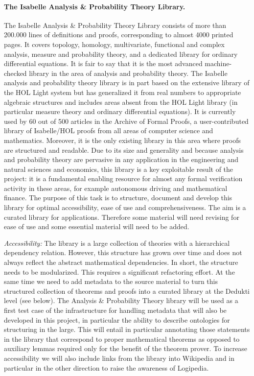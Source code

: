 \paragraph*{The Isabelle Analysis \& Probability Theory Library.}
The Isabelle Analysis \& Probability Theory Library consists of more
than 200.000 lines of definitions and proofs, corresponding to almost
4000 printed pages. It covers topology, homology, multivariate,
functional and complex analysis, measure and probability theory, and a
dedicated library for ordinary differential equations. It is fair to
say that it is the most advanced machine-checked library in the area
of analysis and probability theory. The Isabelle analysis and
probability theory library is in part based on the extensive library
of the HOL Light system but has generalized it from real numbers to
appropriate algebraic structures and includes areas absent from the
HOL Light library (in particular measure theory and ordinary
differential equations). It is currently used by 60 out of 500
articles in the Archive of Formal Proofs, a user-contributed library
of Isabelle/HOL proofs from all areas of computer science and
mathematics. Moreover, it is the only existing library in this area
where proofs are structured and readable. Due to its size and
generality and because analysis and probability theory are pervasive
in any application in the engineering and natural sciences and
economics, this library is a key exploitable result of the project: it
is a fundamental enabling resource for almost any formal verification
activity in these areas, for example autonomous driving and
mathematical finance. The purpose of this task is to structure,
document and develop this library for optimal accessibility, ease of
use and comprehensiveness. The aim is a curated library for
applications.  Therefore some material will need revising for ease of
use and some essential material will need to be added.

\emph{Accessibility:}
The library is a large collection of theories with a hierarchical dependency
relation. However, this structure has grown over time and does not always
reflect the abstract mathematical dependencies. In short, the structure needs
to be modularized. This requires a significant refactoring effort.
%
At the same time we need to add metadata to the source material to turn this
structured collection of theorems and proofs into a curated library at the
Dedukti level (see below). The Analysis \& Probability Theory library will be
used as a first test case of the infrastructure
for handling metadata that will also be developed in this project, in
particular the ability to describe ontologies for structuring in the large.
This will entail in particular annotating those statements in the library that
correspond to proper mathematical theorems as opposed to auxiliary lemmas
required only for the benefit of the theorem prover.
To increase accessibility we will also include links from the library into
Wikipedia and in particular in the other direction to raise the awareness
of Logipedia.

